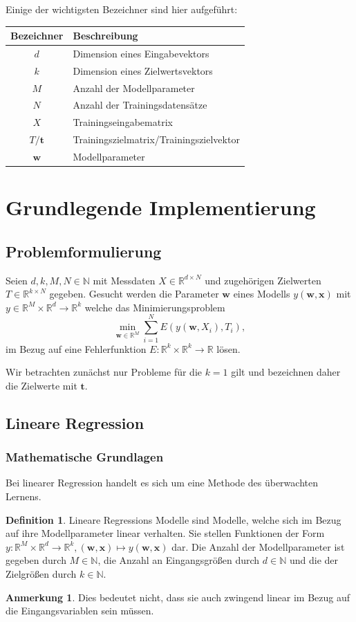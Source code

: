 \documentclass{article}
\theoremstyle{plain} %
\theoremstyle{definition} %
\newtheorem{definition}[theorem]{Definition}
\newtheorem{anno}[theorem]{Anmerkung}
\begin{document}
Einige der wichtigsten Bezeichner sind hier aufgeführt:

\begin{tabular}{cl}
  \toprule
  Bezeichner & Beschreibung\\
  \midrule
  $d$ & Dimension eines Eingabevektors\\
  $k$ & Dimension eines Zielwertsvektors\\
  $M$ & Anzahl der Modellparameter\\
  $N$ & Anzahl der Trainingsdatensätze\\
  $X$ & Trainingseingabematrix\\
  $T/\mathbf{t}$ & Trainingszielmatrix/Trainingszielvektor\\
  $\mathbf{w}$ & Modellparameter\\
\end{tabular}


\section{Grundlegende Implementierung}
\subsection{Problemformulierung}
Seien $d,k,M,N \in \mathbb{N}$ mit Messdaten $X \in \mathbb{R}^{d \times N}$ und zugehörigen Zielwerten $T \in \mathbb{R}^{k \times N}$ gegeben. Gesucht werden die Parameter $\mathbf{w}$ eines Modells $y(\mathbf{w}, \mathbf{x})$ mit $y \in \mathbb{R}^M \times \mathbb{R}^d \rightarrow \mathbb{R}^{k}$ welche das Minimierungsproblem
$$
    \min_{\mathbf{w} \in \mathbb{R}^M}\sum_{i=1}^N E(y(\mathbf{w}, X_{i}), T_{i}),
$$
im Bezug auf eine Fehlerfunktion $E: \mathbb{R}^k \times \mathbb{R}^k \rightarrow \mathbb{R}$ lösen.

Wir betrachten zunächst nur Probleme für die $k=1$ gilt und bezeichnen daher die Zielwerte mit $\mathbf{t}$.

\subsection{Lineare Regression}
\subsubsection{Mathematische Grundlagen}
Bei linearer Regression handelt es sich um eine Methode des überwachten Lernens.
\begin{definition}
  Lineare Regressions Modelle sind Modelle, welche sich im Bezug auf ihre Modellparameter linear verhalten\cite[S. 137f]{Bishop}. Sie stellen Funktionen der Form $y: \mathbb{R}^M \times \mathbb{R}^d \rightarrow \mathbb{R}^k, (\mathbf{w}, \mathbf{x}) \mapsto y(\mathbf{w}, \mathbf{x})$ dar. Die Anzahl der Modellparameter ist gegeben durch $M \in \mathbb{N}$, die Anzahl an Eingangsgrößen durch $d \in \mathbb{N}$ und die der Zielgrößen durch $k \in \mathbb{N}$.
\end{definition}
\begin{anno}
  Dies bedeutet nicht, dass sie auch zwingend linear im Bezug auf die Eingangsvariablen sein müssen.
\end{anno}
\end{document}
